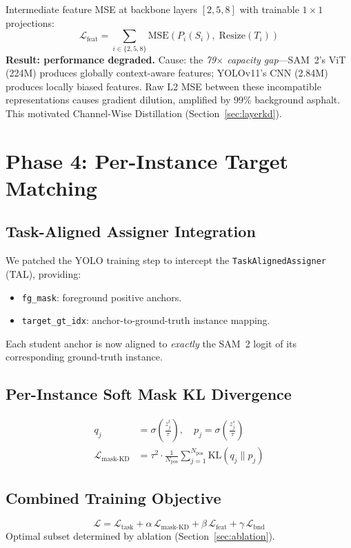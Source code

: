 \documentclass[12pt,a4paper]{article}
\begin{document}
Intermediate feature MSE at backbone layers $[2,5,8]$ with trainable
$1\times1$ projections:
\[
\mathcal{L}_\text{feat} = \sum_{i\in\{2,5,8\}}\mathrm{MSE}(P_i(S_i),\;\mathrm{Resize}(T_i))
\]
\textbf{Result: performance degraded.}
Cause: the \emph{79$\times$ capacity gap}---SAM~2's ViT (224M) produces
globally context-aware features; YOLOv11's CNN (2.84M) produces locally biased
features. Raw L2 MSE between these incompatible representations causes gradient
dilution, amplified by 99\% background asphalt.
This motivated Channel-Wise Distillation (Section~\ref{sec:layerkd}).

\section{Phase 4: Per-Instance Target Matching}
\label{sec:phase4}

\subsection{Task-Aligned Assigner Integration}

We patched the YOLO training step to intercept the \texttt{TaskAlignedAssigner}
(TAL), providing:
\begin{itemize}
  \item \texttt{fg\_mask}: foreground positive anchors.
  \item \texttt{target\_gt\_idx}: anchor-to-ground-truth instance mapping.
\end{itemize}
Each student anchor is now aligned to \emph{exactly} the SAM~2 logit of its
corresponding ground-truth instance.

\subsection{Per-Instance Soft Mask KL Divergence}
\label{sec:mask_kd}

\begin{align}
q_j &= \sigma\!\left(\frac{z^t_j}{\tau}\right),\quad
p_j = \sigma\!\left(\frac{z^s_j}{\tau}\right) \\
\mathcal{L}_\text{mask-KD} &= \tau^2\cdot\frac{1}{N_\text{pos}}
  \sum_{j=1}^{N_\text{pos}}\mathrm{KL}(q_j\|p_j)
\label{eq:mask_kd}
\end{align}

\subsection{Combined Training Objective}
\[
\mathcal{L} = \mathcal{L}_\text{task}
  + \alpha\,\mathcal{L}_\text{mask-KD}
  + \beta\,\mathcal{L}_\text{feat}
  + \gamma\,\mathcal{L}_\text{bnd}
\]
Optimal subset determined by ablation (Section~\ref{sec:ablation}).
\end{document}
